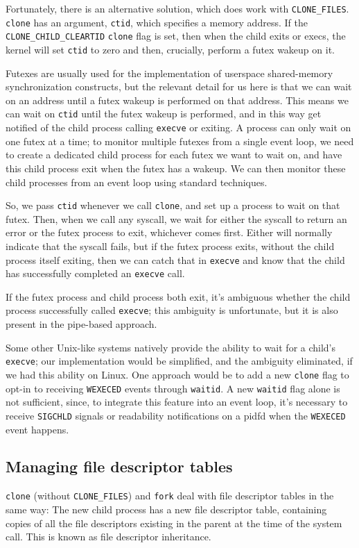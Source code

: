 \documentclass[letterpaper,twocolumn,10pt]{article}
\begin{document}
Fortunately, there is an alternative solution, which does work with \verb|CLONE_FILES|.
\texttt{clone} has an argument, \texttt{ctid}, which specifies a memory address.
If the \verb|CLONE_CHILD_CLEARTID| \texttt{clone} flag is set,
then when the child exits or execs,
the kernel will set \texttt{ctid} to zero and then,
crucially, perform a futex wakeup on it.\cite{clone}

Futexes are usually used for the implementation of userspace shared-memory synchronization constructs,
but the relevant detail for us here is that we can wait on an address
until a futex wakeup is performed on that address.\cite{futex}
This means we can wait on \texttt{ctid} until the futex wakeup is performed,
and in this way get notified of the child process calling \texttt{execve} or exiting.
A process can only wait on one futex at a time;
to monitor multiple futexes from a single event loop,
we need to create a dedicated child process for each futex we want to wait on,
and have this child process exit when the futex has a wakeup.
We can then monitor these child processes from an event loop using standard techniques.\cite{signalfd}\cite{pidfd}

So, we pass \texttt{ctid} whenever we call \texttt{clone},
and set up a process to wait on that futex.
Then, when we call any syscall,
we wait for either the syscall to return an error or the futex process to exit,
whichever comes first.
Either will normally indicate that the syscall fails,
but if the futex process exits,
without the child process itself exiting,
then we can catch that in \texttt{execve}
and know that the child has successfully completed an \texttt{execve} call.

If the futex process and child process both exit,
it's ambiguous whether the child process successfully called \texttt{execve};
this ambiguity is unfortunate, but it is also present in the pipe-based approach.

Some other Unix-like systems natively provide the ability to wait for a child's \texttt{execve};
our implementation would be simplified, and the ambiguity eliminated,
if we had this ability on Linux.\cite{freebsd_kqueue}
One approach would be to add a new \texttt{clone} flag to
opt-in to receiving \texttt{WEXECED} events through \texttt{waitid}.
A new \texttt{waitid} flag alone is not sufficient,
since, to integrate this feature into an event loop,
it's necessary to receive \texttt{SIGCHLD} signals or readability notifications on a pidfd
when the \texttt{WEXECED} event happens.
\subsection{Managing file descriptor tables}\label{fdtables}
\texttt{clone} (without \verb|CLONE_FILES|) and \texttt{fork}
deal with file descriptor tables in the same way:
The new child process has a new file descriptor table,
containing copies of all the file descriptors existing in the parent at the time of the system call.
This is known as file descriptor inheritance.
\end{document}
